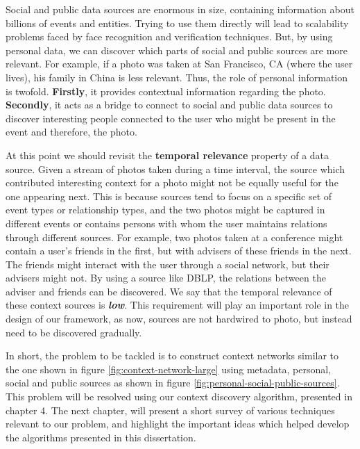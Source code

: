 Social and public data sources are enormous in size, containing information about billions of events and entities. Trying to use them directly will lead to scalability problems faced by face recognition and verification techniques. But, by using personal data, we can discover which parts of social and public sources are more relevant. For example, if a photo was taken at San Francisco, CA (where the user lives), his family in China is less relevant. Thus, the role of personal information is twofold. \textbf{Firstly}, it provides contextual information regarding the photo. \textbf{Secondly}, it acts as a bridge to connect to social and public data sources to discover interesting people connected to the user who might be present in the event and therefore, the photo.

At this point we should revisit the \textbf{temporal relevance} property of a data source. Given a stream of photos taken during a time interval, the source which contributed interesting context for a photo might not be equally useful for the one appearing next. This is because sources tend to focus on a specific set of event types or relationship types, and the two photos might be captured in different events or contains persons with whom the user maintains relations through different sources. For example, two photos taken at a conference might contain a user's friends in the first, but with advisers of these friends in the next. The friends might interact with the user through a social network, but their advisers might not. By using a source like DBLP, the relations between the adviser and friends can be discovered. We say that the temporal relevance of these context sources is \textbf{\textit{low}}. This requirement will play an important role in the design of our framework, as now, sources are not hardwired to photo, but instead need to be discovered gradually.

In short, the problem to be tackled is to construct context networks similar to the one shown in figure \ref{fig:context-network-large} using metadata, personal, social and public sources as shown in figure \ref{fig:personal-social-public-sources}. This problem will be resolved using our context discovery algorithm, presented in chapter 4. The next chapter, will present a short survey of various techniques relevant to our problem, and highlight the important ideas which helped develop the algorithms presented in this dissertation.
